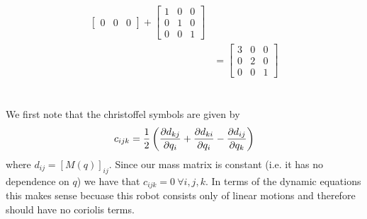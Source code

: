 \documentclass{../homework}
\begin{document}
\begin{parts}[n]
\begin{parts}
\begin{parts}[r]
\[\begin{aligned}
\begin{bmatrix}
                                0 & 0 & 0
                            \end{bmatrix}
                            +
                            \begin{bmatrix}
                                1 & 0 & 0 \\
                                0 & 1 & 0 \\
                                0 & 0 & 1
                            \end{bmatrix}
                            \\
                            &= 
                            \begin{bmatrix}
                                3 & 0 & 0 \\
                                0 & 2 & 0 \\
                                0 & 0 & 1
                            \end{bmatrix}
                   \end{aligned}
               \]
               \part{}
               We first note that the christoffel symbols are given by
               \[
                   c_{ijk} = \frac{1}{2} \left( \pdv{d_{kj}}{q_i} + \pdv{d_{ki}}{q_i} - \pdv{d_{ij}}{q_k} \right)
               \]
               where $d_{ij} = [M(q)]_{ij}$. Since our mass matrix is constant (i.e. it has no dependence on $q$) we have that $c_{ijk} = 0 \ \forall i,j,k$. In terms of the dynamic equations this makes sense becuase this robot consists only of linear motions and therefore should have no coriolis terms.

\end{parts}
\end{parts}
\end{parts}
\end{document}
